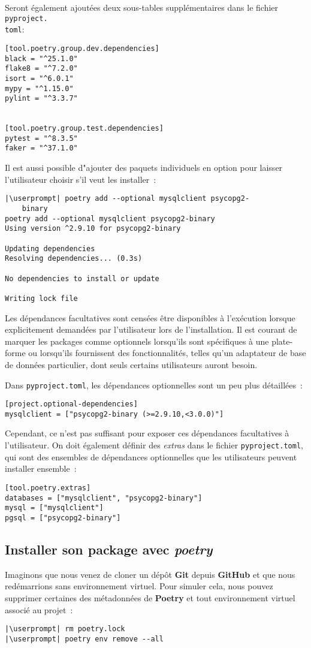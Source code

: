 Seront également ajoutées deux sous-tables supplémentaires dans le fichier \texttt{pyproject.\\toml}:
\begin{lstlisting}[style=file]
[tool.poetry.group.dev.dependencies]
black = "^25.1.0"
flake8 = "^7.2.0"
isort = "^6.0.1"
mypy = "^1.15.0"
pylint = "^3.3.7"


[tool.poetry.group.test.dependencies]
pytest = "^8.3.5"
faker = "^37.1.0"
\end{lstlisting}

Il est aussi possible d"ajouter des paquets individuels en option pour laisser l’utilisateur choisir s’il veut les installer :
\begin{lstlisting}[style=bash]
|\userprompt| poetry add --optional mysqlclient psycopg2-
    binary
poetry add --optional mysqlclient psycopg2-binary
Using version ^2.9.10 for psycopg2-binary

Updating dependencies
Resolving dependencies... (0.3s)

No dependencies to install or update

Writing lock file
\end{lstlisting}

Les dépendances facultatives sont censées être disponibles à l’exécution lorsque explicitement demandées par l’utilisateur lors de l’installation. Il est courant de marquer les packages comme optionnels lorsqu’ils sont spécifiques à une plate-forme ou lorsqu’ils fournissent des fonctionnalités, telles qu’un adaptateur de base de données particulier, dont seuls certains utilisateurs auront besoin.

Dans \texttt{pyproject.toml}, les dépendances optionnelles sont un peu plus détaillées :
\begin{lstlisting}[style=file]
[project.optional-dependencies]
mysqlclient = ["psycopg2-binary (>=2.9.10,<3.0.0)"]
\end{lstlisting}

Cependant, ce n’est pas suffisant pour exposer ces dépendances facultatives à l’utilisateur. On doit également définir des \textit{extras} dans le fichier \texttt{pyproject.toml}, qui sont des ensembles de dépendances optionnelles que les utilisateurs peuvent installer ensemble :
\begin{lstlisting}[style=file]
[tool.poetry.extras]
databases = ["mysqlclient", "psycopg2-binary"]
mysql = ["mysqlclient"]
pgsql = ["psycopg2-binary"]
\end{lstlisting}

\subsection*{Installer son package avec \textit{poetry}}
Imaginons que nous venez de cloner un dépôt \textbf{Git} depuis \textbf{GitHub} et que nous redémarrions sans environnement virtuel. Pour simuler cela, nous pouvez supprimer certaines des métadonnées de \textbf{Poetry} et tout environnement virtuel associé au projet :
\begin{lstlisting}[style=bash]
|\userprompt| rm poetry.lock
|\userprompt| poetry env remove --all
\end{lstlisting}

